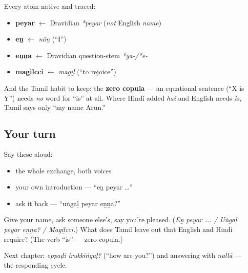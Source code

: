 Every atom native and traced:

\begin{itemize}
\raggedright
  \item \textbf{peyar} $\leftarrow$ Dravidian \emph{*peyar} (\emph{not} English \emph{name})
  \item \textbf{eṉ} $\leftarrow$ \emph{nāṉ} (\textquotedblleft{}I\textquotedblright{})
  \item \textbf{eṉṉa} $\leftarrow$ Dravidian question-stem \emph{*yā-/*e-}
  \item \textbf{magiḻcci} $\leftarrow$ \emph{magiḻ} (\textquotedblleft{}to rejoice\textquotedblright{})
\end{itemize}

And the Tamil habit to keep: the \textbf{zero copula} — an equational sentence (\textquotedblleft{}X is Y\textquotedblright{}) needs \emph{no} word for \textquotedblleft{}is\textquotedblright{} at all. Where Hindi added \emph{hai} and English needs \emph{is}, Tamil says only \textquotedblleft{}my name Arun.\textquotedblright{}

\subsection*{Your turn}
Say these aloud:

\begin{itemize}
\raggedright
  \item the whole exchange, both voices
  \item your own introduction — \textquotedblleft{}eṉ peyar …\textquotedblright{}
  \item ask it back — \textquotedblleft{}uṅgaḷ peyar eṉṉa?\textquotedblright{}
\end{itemize}

\begin{tcolorbox}[breakable,colback=teal!4,colframe=teal!35!black,title={Before you move on}]
Give your name, ask someone else's, say you're pleased. (\emph{Eṉ peyar …. / Uṅgaḷ peyar eṉṉa? / Magiḻcci.}) What does Tamil leave out that English and Hindi require? (The verb \textquotedblleft{}is\textquotedblright{} — zero copula.)

Next chapter: \emph{eppaḍi irukkīṅgaḷ?} (\textquotedblleft{}how are you?\textquotedblright{}) and answering with \emph{nallā} — the responding cycle.
\end{tcolorbox}

